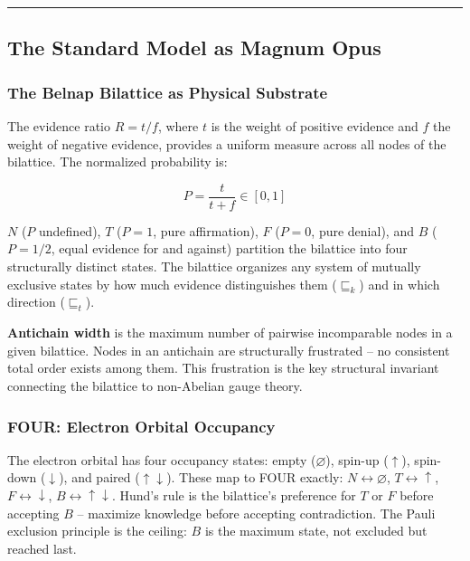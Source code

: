 \begin{center}\rule{0.5\linewidth}{0.5pt}\end{center}

\hypertarget{the-standard-model-as-magnum-opus}{%
\subsection{The Standard Model as Magnum
Opus}\label{the-standard-model-as-magnum-opus}}

\hypertarget{the-belnap-bilattice-as-physical-substrate}{%
\subsubsection{The Belnap Bilattice as Physical
Substrate}\label{the-belnap-bilattice-as-physical-substrate}}

The evidence ratio \(R = t/f\), where \(t\) is the weight of positive
evidence and \(f\) the weight of negative evidence, provides a uniform
measure across all nodes of the bilattice. The normalized probability
is:

\[P = \frac{t}{t + f} \in [0, 1]\]

\(N\) (\(P\) undefined), \(T\) (\(P = 1\), pure affirmation), \(F\)
(\(P = 0\), pure denial), and \(B\) (\(P = 1/2\), equal evidence for and
against) partition the bilattice into four structurally distinct states.
The bilattice organizes any system of mutually exclusive states by how
much evidence distinguishes them (\(\sqsubseteq_k\)) and in which
direction (\(\sqsubseteq_t\)).

\textbf{Antichain width} is the maximum number of pairwise incomparable
nodes in a given bilattice. Nodes in an antichain are structurally
frustrated -- no consistent total order exists among them. This
frustration is the key structural invariant connecting the bilattice to
non-Abelian gauge theory.

\hypertarget{four-electron-orbital-occupancy}{%
\subsubsection{FOUR: Electron Orbital
Occupancy}\label{four-electron-orbital-occupancy}}

The electron orbital has four occupancy states: empty (\(\varnothing\)),
spin-up (\(\uparrow\)), spin-down (\(\downarrow\)), and paired
(\(\uparrow\downarrow\)). These map to FOUR exactly:
\(N \leftrightarrow \varnothing\), \(T \leftrightarrow \uparrow\),
\(F \leftrightarrow \downarrow\),
\(B \leftrightarrow \uparrow\downarrow\). Hund's rule is the bilattice's
preference for \(T\) or \(F\) before accepting \(B\) -- maximize
knowledge before accepting contradiction. The Pauli exclusion principle
is the ceiling: \(B\) is the maximum state, not excluded but reached
last.

